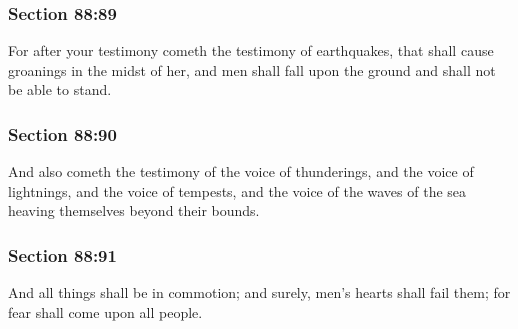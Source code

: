 	\subsubsection{Section 88:89} %
		\label{DC88-89}

		For after your testimony cometh the testimony of earthquakes, that shall cause groanings in the midst of her, and men shall fall upon the ground and shall not be able to stand.


	\subsubsection{Section 88:90} %
		\label{DC88-90}

		And also cometh the testimony of the voice of thunderings, and the voice of lightnings, and the voice of tempests, and the voice of the waves of the sea heaving themselves beyond their bounds.


	\subsubsection{Section 88:91} %
		\label{DC88-91}

		And all things shall be in commotion; and surely, men's hearts shall fail them; for fear shall come upon all people.


